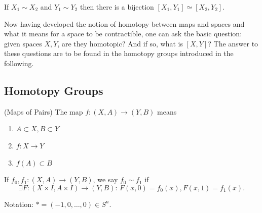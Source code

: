 \documentclass[a4paper,11pt]{article}
\begin{document}
		\begin{lemma}
			If $X_1\sim X_2$ and $Y_1\sim Y_2$ then there is a bijection $[X_1,Y_1]\simeq [X_2,Y_2]$.
		\end{lemma}

		Now having developed the notion of homotopy between maps and spaces and what it means for a space to be contractible, one can ask the basic question: given spaces $X,Y$, are they homotopic? And if so, what is $[X,Y]$? The answer to these questions are to be found in the homotopy groups introduced in the following.

		\subsection{Homotopy Groups}
			
			\begin{defi}(Maps of Pairs)
				The map $f:(X,A)\rightarrow (Y,B)$ means
				\begin{enumerate}
					\item $A\subset X,B\subset Y$
					\item $f:X\rightarrow Y$
					\item $f(A)\subset B$
				\end{enumerate}
				If $f_0,f_1:(X,A)\rightarrow (Y,B)$, we say $f_0\sim f_1$ if
				\begin{equation}
					\exists F:(X\times I,A\times I)\rightarrow (Y,B):\,F(x,0)=f_0(x),F(x,1)=f_1(x).
				\end{equation}
			\end{defi}

			Notation: $\ast=(-1,0,\dots,0)\in S^{n}$.
\end{document}
